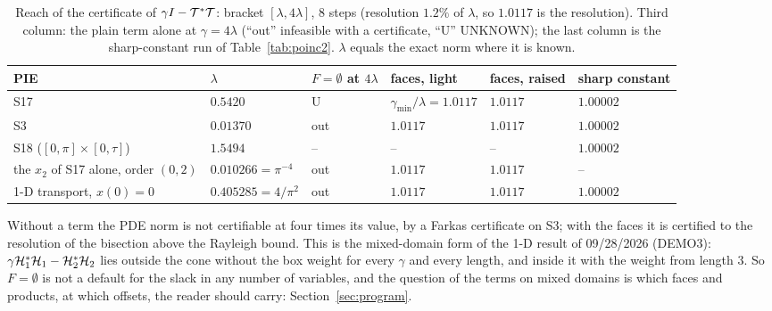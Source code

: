 \begin{table}[h]\centering\scriptsize
\setlength{\tabcolsep}{4pt}
\begin{tabular}{llllll}
\toprule
PIE & $\lambda$ & $F=\emptyset$ at $4\lambda$ & faces, light & faces, raised & sharp constant \\
\midrule
S17 & $0.5420$ & U & $\gamma_{\min}/\lambda=1.0117$ & $1.0117$ & $1.00002$ \\
S3 & $0.01370$ & out & $1.0117$ & $1.0117$ & $1.00002$ \\
S18 ($[0,\pi]\times[0,\tau]$) & $1.5494$ & -- & -- & -- & $1.00002$ \\
the $x_2$ of S17 alone, order $(0,2)$ & $0.010266=\pi^{-4}$ & out & $1.0117$ & $1.0117$ & -- \\
1-D transport, $x(0)=0$ & $0.405285=4/\pi^2$ & out & $1.0117$ & $1.0117$ & $1.00002$ \\
\bottomrule
\end{tabular}
\caption{Reach of the certificate of $\gamma I-\mathcal{T}^*\mathcal{T}$: bracket $[\lambda,4\lambda]$, 8 steps (resolution $1.2\%$ of $\lambda$, so $1.0117$ is the resolution). Third column: the plain term alone at $\gamma=4\lambda$ (``out'' infeasible with a certificate, ``U'' UNKNOWN); the last column is the sharp-constant run of Table~\ref{tab:poinc2}. $\lambda$ equals the exact norm where it is known.}\label{tab:poinc}
\end{table}

Without a term the PDE norm is not certifiable at four times its value, by a Farkas certificate on S3; with the faces it is certified to the resolution of the bisection above the Rayleigh bound. This is the mixed-domain form of the 1-D result of 09/28/2026 (DEMO3): $\gamma\mathcal{H}_1^*\mathcal{H}_1-\mathcal{H}_2^*\mathcal{H}_2$ lies outside the cone without the box weight for every $\gamma$ and every length, and inside it with the weight from length $3$. So $F=\emptyset$ is not a default for the slack in any number of variables, and the question of the terms on mixed domains is which faces and products, at which offsets, the reader should carry: Section~\ref{sec:program}.

